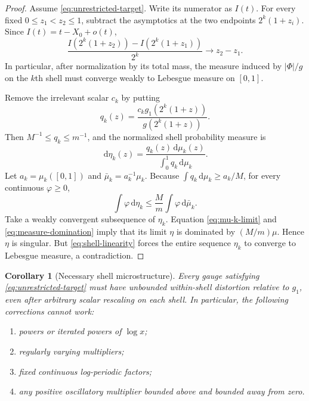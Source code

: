\documentclass[11pt,oneside]{article}
\numberwithin{equation}{section}
\newtheorem{corollary}[theorem]{Corollary}
\theoremstyle{definition}
\theoremstyle{remark}
\newcommand{\dd}{\,\mathrm d}
\newcommand{\abs}[1]{\left|#1\right|}
\newcommand{\PhiUp}{\Phi}
\begin{document}
\begin{proof}
Assume \eqref{eq:unrestricted-target}.  Write its numerator as \(I(t)\).  For every fixed
\(0\le z_1<z_2\le1\), subtract the asymptotics at the two endpoints
\(2^k(1+z_i)\).  Since \(I(t)=t-X_0+o(t)\),
\begin{equation}
 \frac{I(2^k(1+z_2))-I(2^k(1+z_1))}{2^k}
 \longrightarrow z_2-z_1.
 \label{eq:shell-linearity}
\end{equation}
In particular, after normalization by its total mass, the measure induced by
\(\abs{\PhiUp}/g\) on the \(k\)th shell must converge weakly to Lebesgue measure on
\([0,1]\).

Remove the irrelevant scalar \(c_k\) by putting
\[
 q_k(z)=\frac{c_kg_1(2^k(1+z))}{g(2^k(1+z))}.
\]
Then \(M^{-1}\le q_k\le m^{-1}\), and the normalized shell probability measure is
\begin{equation}
 \dd\eta_k(z)=
 \frac{q_k(z)\dd\mu_k(z)}{\int_0^1q_k\dd\mu_k}.
 \label{eq:eta-k}
\end{equation}
Let \(a_k=\mu_k([0,1])\) and \(\bar\mu_k=a_k^{-1}\mu_k\).  Because
\(\int q_k\dd\mu_k\ge a_k/M\), for every continuous \(\varphi\ge0\),
\begin{equation}
 \int\varphi\dd\eta_k
 \le\frac{M}{m}\int\varphi\dd\bar\mu_k.
 \label{eq:measure-domination}
\end{equation}
Take a weakly convergent subsequence of \(\eta_k\).  Equation
\eqref{eq:mu-k-limit} and \eqref{eq:measure-domination} imply that its limit \(\eta\) is
dominated by \((M/m)\mu\).  Hence \(\eta\) is singular.  But
\eqref{eq:shell-linearity} forces the entire sequence \(\eta_k\) to converge to Lebesgue
measure, a contradiction.
\end{proof}

\begin{corollary}[Necessary shell microstructure]
\label{cor:microstructure}
Every gauge satisfying \eqref{eq:unrestricted-target} must have unbounded within-shell
distortion relative to \(g_1\), even after arbitrary scalar rescaling on each shell.
In particular, the following corrections cannot work:
\begin{enumerate}
\item powers or iterated powers of \(\log x\);
\item regularly varying multipliers;
\item fixed continuous log-periodic factors;
\item any positive oscillatory multiplier bounded above and bounded away from zero.
\end{enumerate}
\end{corollary}
\end{document}
